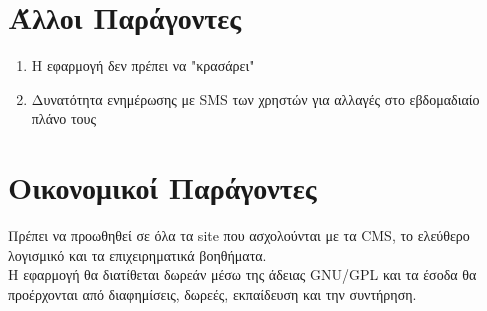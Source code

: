 \documentclass[12pt]{article}
\begin{document}
\section{Άλλοι Παράγοντες}
\begin{enumerate}
\item{Η εφαρμογή δεν πρέπει να "κρασάρει"}
\item{Δυνατότητα ενημέρωσης με SMS των χρηστών για αλλαγές στο εβδομαδιαίο πλάνο τους}
\end{enumerate}

\section{Οικονομικοί Παράγοντες}
Πρέπει να προωθηθεί σε όλα τα site που ασχολούνται με τα CMS, το ελεύθερο λογισμικό και τα επιχειρηματικά βοηθήματα.
\\[0.3cm]
Η εφαρμογή θα διατίθεται δωρεάν μέσω της άδειας GNU/GPL και τα έσοδα θα προέρχονται από διαφημίσεις, δωρεές, εκπαίδευση και την συντήρηση.
\end{document}
